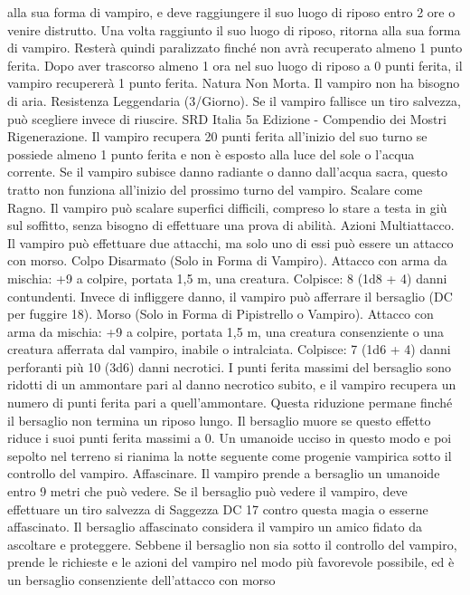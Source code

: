 \begin{multicols}{2}
alla sua forma di vampiro, e deve raggiungere il suo luogo di
riposo entro 2 ore o venire distrutto. Una volta raggiunto il suo
luogo di riposo, ritorna alla sua forma di vampiro. Resterà quindi
paralizzato finché non avrà recuperato almeno 1 punto ferita.
Dopo aver trascorso almeno 1 ora nel suo luogo di riposo a 0
punti ferita, il vampiro recupererà 1 punto ferita.
Natura Non Morta. Il vampiro non ha bisogno di aria.
Resistenza Leggendaria (3/Giorno). Se il vampiro fallisce un
tiro salvezza, può scegliere invece di riuscire.
SRD Italia 5a Edizione - Compendio dei Mostri
Rigenerazione. Il vampiro recupera 20 punti ferita all’inizio del
suo turno se possiede almeno 1 punto ferita e non è esposto alla
luce del sole o l’acqua corrente. Se il vampiro subisce danno
radiante o danno dall’acqua sacra, questo tratto non funziona
all’inizio del prossimo turno del vampiro.
Scalare come Ragno. Il vampiro può scalare superfici difficili,
compreso lo stare a testa in giù sul soffitto, senza bisogno di
effettuare una prova di abilità.
Azioni
Multiattacco. Il vampiro può effettuare due attacchi, ma solo uno
di essi può essere un attacco con morso.
Colpo Disarmato (Solo in Forma di Vampiro). Attacco con
arma da mischia: +9 a colpire, portata 1,5 m, una creatura.
Colpisce: 8 (1d8 + 4) danni contundenti. Invece di infliggere
danno, il vampiro può afferrare il bersaglio (DC per fuggire 18).
Morso (Solo in Forma di Pipistrello o Vampiro). Attacco con
arma da mischia: +9 a colpire, portata 1,5 m, una creatura
consenziente o una creatura afferrata dal vampiro, inabile o
intralciata.
Colpisce: 7 (1d6 + 4) danni perforanti più 10 (3d6) danni
necrotici. I punti ferita massimi del bersaglio sono ridotti di un
ammontare pari al danno necrotico subito, e il vampiro recupera
un numero di punti ferita pari a quell’ammontare. Questa
riduzione permane finché il bersaglio non termina un riposo
lungo. Il bersaglio muore se questo effetto riduce i suoi punti
ferita massimi a 0. Un umanoide ucciso in questo modo e poi
sepolto nel terreno si rianima la notte seguente come progenie
vampirica sotto il controllo del vampiro.
Affascinare. Il vampiro prende a bersaglio un umanoide entro 9
metri che può vedere. Se il bersaglio può vedere il vampiro, deve
effettuare un tiro salvezza di Saggezza DC 17 contro questa
magia o esserne affascinato. Il bersaglio affascinato considera il
vampiro un amico fidato da ascoltare e proteggere. Sebbene il
bersaglio non sia sotto il controllo del vampiro, prende le
richieste e le azioni del vampiro nel modo più favorevole
possibile, ed è un bersaglio consenziente dell’attacco con morso

\end{multicols}
